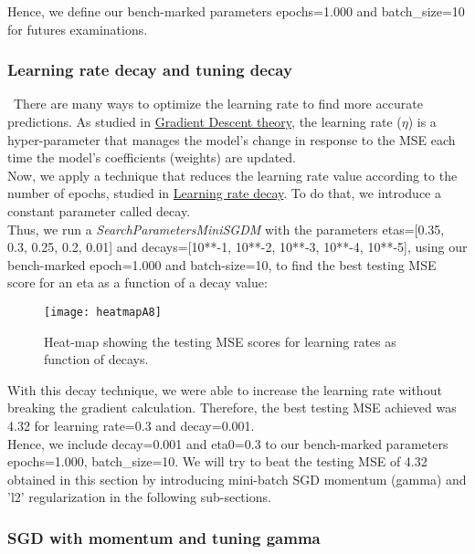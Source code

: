 Hence, we define our bench-marked parameters epochs=1.000 and batch\_size=10 for futures examinations.

\subsubsection{Learning rate decay and tuning decay}
\label{chap:Learning rate decay and tuning decay}

\quad \, There are many ways to optimize the learning rate to find more accurate predictions. As studied in \hyperref[chap:Gradient Decedent]{Gradient Descent theory}, the learning rate ($\eta$) is a hyper-parameter that manages the model's change in response to the MSE each time the model's coefficients (weights) are updated.\\

Now, we apply a technique that reduces the learning rate value according to the number of epochs, studied in \hyperref[chap:Learning Rate with decay]{Learning rate decay}. To do that, we introduce a constant parameter called decay.\\

Thus, we run a \textit{SearchParametersMiniSGDM} with the parameters etas=[0.35, 0.3, 0.25, 0.2, 0.01] and decays=[10**-1, 10**-2, 10**-3, 10**-4, 10**-5], using our bench-marked epoch=1.000 and batch-size=10, to find the best testing MSE score for an eta as a function of a decay value:

\begin{figure}[H]
\label{fig:figA7}
\centering
\texttt{[image: heatmapA8]}
\caption{Heat-map showing the testing MSE scores for learning rates as function of decays.}
\end{figure}

With this decay technique, we were able to increase the learning rate without breaking the gradient calculation. Therefore, the best testing MSE achieved was 4.32 for learning rate=0.3 and decay=0.001.\\

Hence, we include decay=0.001 and eta0=0.3 to our bench-marked parameters epochs=1.000, batch\_size=10. We will try to beat the testing MSE of 4.32 obtained in this section by introducing mini-batch SGD momentum (gamma) and 'l2' regularization in the following sub-sections.

\subsubsection{SGD with momentum and tuning gamma}
\label{chap:SGD with momentum and tuning gamma}

